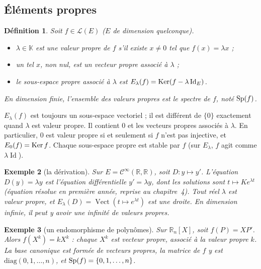 \documentclass[a4paper,11pt]{article}
\numberwithin{equation}{section}
\numberwithin{figure}{section}
\numberwithin{table}{section}
\theoremstyle{enonce}
\newtheorem{definition}{Définition}[section]
\theoremstyle{exemple}
\newtheorem{exemple}[definition]{Exemple}
\theoremstyle{remarque}
\newcommand{\K}{\mathbb{K}}
\newcommand{\R}{\mathbb{R}}
\newcommand{\LE}{\mathcal{L}(E)}
\newcommand{\vect}{\operatorname{Vect}}
\newcommand{\Id}{\operatorname{Id}}
\begin{document}
\subsection{Éléments propres}\label{ss:propres}

\begin{definition}
Soit $f\in\LE$ ($E$ de dimension quelconque).
\begin{itemize}
\item $\lambda\in\K$ est une \emph{valeur propre} de $f$ s'il existe $x\neq0$ tel que $f(x)=\lambda x$ ;
\item un tel $x$, \emph{non nul}, est un \emph{vecteur propre} associé à $\lambda$ ;
\item le \emph{sous-espace propre} associé à $\lambda$ est $E_\lambda(f)=\Ker(f-\lambda\Id_E)$.
\end{itemize}
En dimension finie, l'ensemble des valeurs propres est le \emph{spectre} de $f$, noté $\operatorname{Sp}(f)$.
\end{definition}

\begin{reflexe}
$E_\lambda(f)$ est toujours un sous-espace vectoriel ; il est différent de $\{0\}$ exactement quand $\lambda$ est valeur propre.
Il contient $0$ et les vecteurs propres associés à $\lambda$. En particulier, $0$ est valeur propre si et seulement si $f$ n'est pas
injective, et $E_0(f)=\operatorname{Ker} f$. Chaque sous-espace propre est stable par $f$ (sur $E_\lambda$, $f$ agit comme $\lambda\Id$).
\end{reflexe}

\begin{exemple}[la dérivation]\label{ex:derivation}
Sur $E=\mathcal C^\infty(\R,\R)$, soit $D:y\mapsto y'$. L'équation $D(y)=\lambda y$ est l'équation différentielle $y'=\lambda y$,
dont les solutions sont $t\mapsto Ke^{\lambda t}$ (équation résolue en première année, reprise au chapitre~4). Tout réel $\lambda$ est valeur propre,
et $E_\lambda(D)=\vect(t\mapsto e^{\lambda t})$ est une droite. En dimension infinie, il peut y avoir une infinité de valeurs propres.
\end{exemple}

\begin{exemple}[un endomorphisme de polynômes]
Sur $\R_n[X]$, soit $f(P)=XP'$. Alors $f(X^k)=kX^k$ : chaque $X^k$ est vecteur propre, associé à la valeur propre $k$. La base
canonique est formée de vecteurs propres, la matrice de $f$ y est $\mathrm{diag}(0,1,\dots,n)$, et $\operatorname{Sp}(f)=\{0,1,\dots,n\}$.
\end{exemple}
\end{document}
